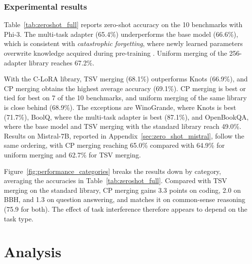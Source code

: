 \documentclass[10pt]{article} %
\begin{document}
    \subsubsection{Experimental results}

    Table~\ref{tab:zeroshot_full} reports zero-shot accuracy on the 10 benchmarks
    with Phi-3. The multi-task adapter (65.4\%) underperforms the base model
    (66.6\%), which is consistent with \textit{catastrophic forgetting}, where
    newly learned parameters overwrite knowledge acquired during pre-training
    \citep{wang2024comprehensive}. Uniform merging of the 256-adapter library
    reaches 67.2\%.

    With the C-LoRA library, TSV merging (68.1\%) outperforms Knots (66.9\%),
    and CP merging obtains the highest average accuracy (69.1\%). CP merging is
    best or tied for best on 7 of the 10 benchmarks, and uniform merging of the same
    library is close behind (68.9\%). The exceptions are WinoGrande, where
    Knots is best (71.7\%), BoolQ, where the multi-task adapter is best (87.1\%),
    and OpenBookQA, where the base model and TSV merging with the standard
    library reach 49.0\%. Results on Mistral-7B, reported in
    Appendix~\ref{sec:zero_shot_mistral}, follow the same ordering, with CP
    merging reaching 65.0\% compared with 64.9\% for uniform merging and 62.7\%
    for TSV merging.

    Figure~\ref{fig:performance_categories} breaks the results down by category,
    averaging the accuracies in Table~\ref{tab:zeroshot_full}. Compared with TSV
    merging on the standard library, CP merging gains 3.3 points on coding, 2.0 on
    BBH, and 1.3 on question answering, and matches it on common-sense reasoning
    (75.9 for both). The effect of task interference therefore appears to depend
    on the task type.

\section{Analysis}

\end{document}

